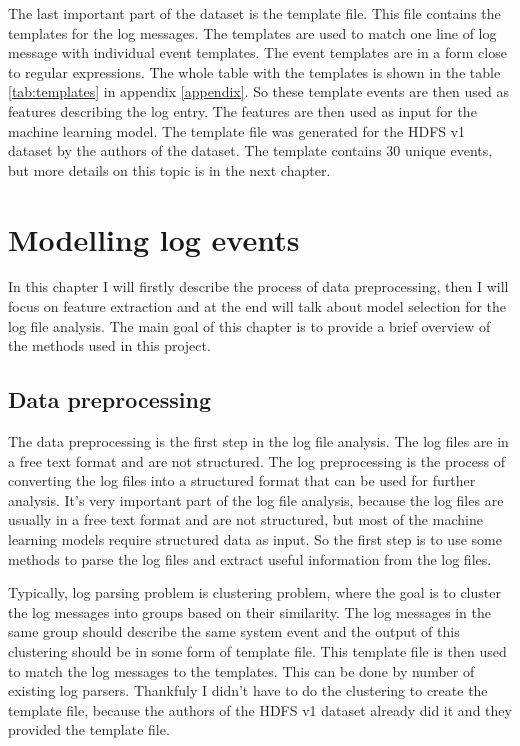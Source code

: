 The last important part of the dataset is the template file. This file contains the templates for the log messages. The templates are used to match one line of log message with individual event templates. The event templates are in a form close to regular expressions.
The whole table with the templates is shown in the table \ref{tab:templates} in appendix \ref{appendix}. So these template events are then used as features describing the log entry. The features are then used as input for the machine learning model.
The template file was generated for the HDFS v1 dataset by the authors of the dataset. The template contains 30 unique events, but more details on this topic is in the next chapter.

\chapter{Modelling log events}
In this chapter I will firstly describe the process of data preprocessing, then I will focus on feature extraction and at the end will talk about model selection for the log file analysis. 
The main goal of this chapter is to provide a brief overview of the methods used in this project.


\section{Data preprocessing}
The data preprocessing is the first step in the log file analysis. The log files are in a free text format and are not structured. 
The log preprocessing is the process of converting the log files into a structured format that can be used for further analysis. It's very important part 
of the log file analysis, because the log files are usually in a free text format and are not structured, but most of the machine learning models require structured data as input.
So the first step is to use some methods to parse the log files and extract useful information from the log files. 

Typically, log parsing problem is clustering problem, where the goal is to cluster the log messages into groups based on their similarity. The log messages in the same group
should describe the same system event and the output of this clustering should be in some form of template file. This template file is then used to match the log messages to the templates. 
This can be done by number of existing log parsers. %
Thankfuly I didn't have to do the clustering to create the template file, because the authors of the HDFS v1 dataset already did it and they provided the template file. 

